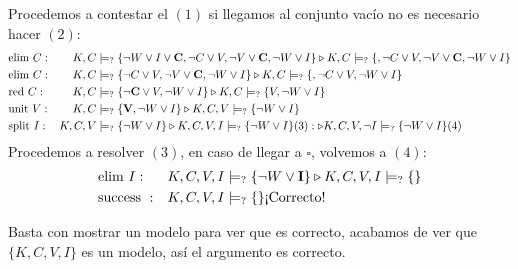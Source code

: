 \documentclass[8pt, letterpaper]{article}
\begin{document}
\begin{enumerate}
  Procedemos a contestar el $(1)$ si llegamos al conjunto vacío no es necesario hacer $(2)$:
  \begin{align*}
    &\text{elim }C: &  K, C &\models_? \{\neg W \lor I \lor {\bf C}, \neg C\lor V, \neg V\lor {\bf C},\neg W\lor I\}
    \triangleright K, C \models_? \{, \neg C\lor V,\neg V\lor {\bf C}, \neg W\lor I\}\\
    &\text{elim }C: & K, C &\models_? \{\neg C\lor V,\neg V\lor {\bf C}, \neg W\lor I\} \triangleright
    K, C \models_? \{, \neg C\lor V, \neg W\lor I\}\\
    &\text{red }C: & K, C &\models_? \{{\bf \neg C}\lor V, \neg W\lor I\} \triangleright K, C \models_? \{ V, \neg W\lor I\}\\
    &\text{unit }V: & K, C &\models_? \{ {\bf V}, \neg W\lor I\} \triangleright  K, C, V \models_? \{\neg W\lor I\}\\
    &\text{split }I: & K, C, V &\models_? \{\neg W\lor I\} \triangleright K, C, V, I \models_? \{\neg W\lor I\} (3) :
    \triangleright K, C, V, \neg I \models_? \{\neg W\lor I\} (4) \\
  \end{align*}
  Procedemos a resolver $(3)$, en caso de llegar a $\square$, volvemos a $(4)$:
  \begin{align*}
    &\text{elim }I: & K, C, V, I &\models_? \{\neg W\lor {\bf I}\} \triangleright K, C, V, I \models_? \{\}\\
    &\text{success }: & K, C, V, I &\models_? \{\} \text{¡Correcto!}
  \end{align*}

  Basta con mostrar un modelo para ver que es correcto, acabamos de ver que $\{ K, C, V, I\}$ es un modelo,
  así el argumento es correcto.
\end{enumerate}
\end{document}
